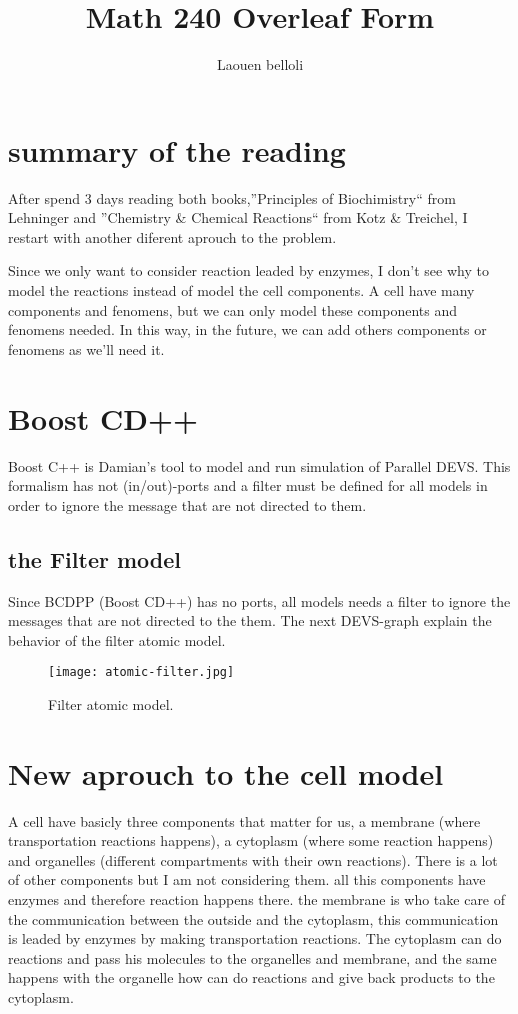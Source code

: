 \documentclass[12pt]{article}
\title{Math 240 Overleaf Form}
\author {Laouen belloli}
\begin{document}
\section*{summary of the reading}
After spend 3 days reading both books,''Principles of Biochimistry`` from Lehninger and ''Chemistry \& Chemical Reactions``  from Kotz \& Treichel, I restart with another diferent aprouch to the problem.

Since we only want to consider reaction leaded by enzymes, I don't see why to model the reactions instead of model the cell components. A cell have many components and fenomens, but we can only model these components and fenomens needed. In this way, in the future, we can add others components or fenomens as we'll need it.

\section*{Boost CD++}
Boost C++ is Damian's tool to model and run simulation of Parallel DEVS. This formalism has not (in/out)-ports and a filter must be defined for all models in order to ignore the message that are not directed to them.

\subsection*{the Filter model}
Since BCDPP (Boost CD++) has no ports, all models needs a filter to ignore the messages that are not directed to the them.
The next DEVS-graph explain the behavior of the filter atomic model.


\begin{figure}[h!]
 \centering
  \texttt{[image: atomic-filter.jpg]}
 \caption{Filter atomic model.}
\end{figure}

\newpage
\section*{New aprouch to the cell model}  
A cell have basicly three components that matter for us, a membrane (where transportation reactions happens), a cytoplasm (where some reaction happens) and organelles (different compartments with their own reactions).
There is a lot of other components but I am not considering them.
all this components have enzymes and therefore reaction happens there. the membrane is who take care of the communication between the outside and the cytoplasm, this communication is leaded by enzymes by making transportation reactions. The cytoplasm can do reactions and pass his molecules to the organelles and membrane, and the same happens with the organelle how can do reactions and give back products to the cytoplasm.
\end{document}
